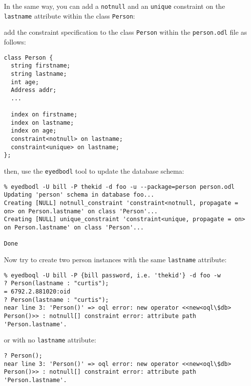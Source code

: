 In the same way, you can add a \texttt{notnull} and an \texttt{unique} constraint
on the \texttt{lastname} attribute within the class \texttt{Person}:
\be
\item add the constraint specification to the class \texttt{Person} within
the \texttt{person.odl} file as follows:
\verbsize \begin{verbatim}
class Person {
  string firstname;
  string lastname;
  int age;
  Address addr;
  ...

  index on firstname;
  index on lastname;
  index on age;
  constraint<notnull> on lastname;
  constraint<unique> on lastname;
};
\end{verbatim}
\normalsize
\item then, use the \texttt{eyedbodl} tool to update the database schema:
\verbsize \begin{verbatim}
% eyedbodl -U bill -P thekid -d foo -u --package=person person.odl
Updating 'person' schema in database foo...
Creating [NULL] notnull_constraint 'constraint<notnull, propagate = on> on Person.lastname' on class 'Person'...
Creating [NULL] unique_constraint 'constraint<unique, propagate = on> on Person.lastname' on class 'Person'...

Done
\end{verbatim}
\normalsize
\ee
Now try to create two person instances with the same \texttt{lastname} attribute:
\verbsize \begin{verbatim}
% eyedboql -U bill -P {bill password, i.e. 'thekid'} -d foo -w
? Person(lastname : "curtis");
= 6792.2.881020:oid
? Person(lastname : "curtis");
near line 3: 'Person()' => oql error: new operator <<new<oql\$db> Person()>> : notnull[] constraint error: attribute path 'Person.lastname'.
\end{verbatim}
\normalsize
or with no \texttt{lastname} attribute:
\verbsize \begin{verbatim}
? Person();
near line 3: 'Person()' => oql error: new operator <<new<oql\$db> Person()>> : notnull[] constraint error: attribute path 'Person.lastname'.
\end{verbatim}
\normalsize





